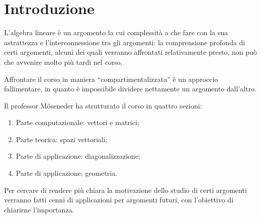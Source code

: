 \chapter*{Introduzione}
L'algebra lineare è un argomento la cui complessità a che fare con la sua astrattezza e l'interconnessione tra gli argomenti: la comprensione profonda di certi argomenti, alcuni dei quali verranno affrontati relativamente presto, non può che avvenire molto più tardi nel corso.

Affrontare il corso in maniera ``compartimentalizzata'' è un approccio fallimentare, in quanto è impossibile dividere nettamente un argomento dall'altro.

Il professor Möseneder ha strutturato il corso in quattro sezioni:
\begin{enumerate}
    \item Parte computazionale: vettori e matrici;
    \item Parte teorica: spazi vettoriali;
    \item Parte di applicazione: diagonalizzazione;
    \item Parte di applicazione: geometria.
\end{enumerate}

Per cercare di rendere più chiara la motivazione dello studio di certi argomenti verranno fatti cenni di applicazioni per argomenti futuri, con l'obiettivo di chiarirne l'importanza.